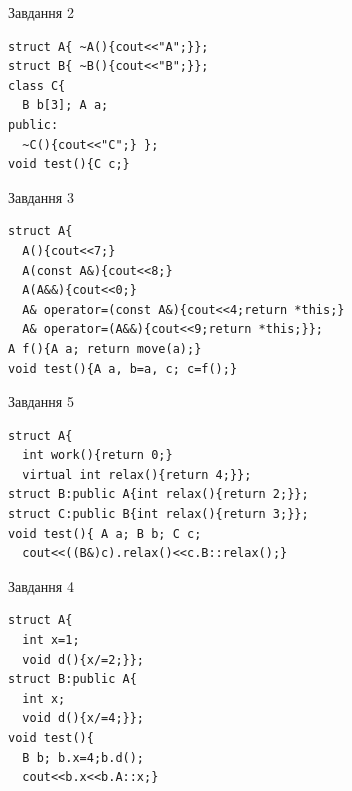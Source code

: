 \documentclass[12pt, ukrainian]{article}
\begin{document}
{{{{{{{\begin{minipage}[t]{11cm}
               
{\begin{center}Завдання {2}\end{center}}
\vspace{-6mm}

\begin{verbatim}
struct A{ ~A(){cout<<"A";}};
struct B{ ~B(){cout<<"B";}};
class C{
  B b[3]; A a;
public:
  ~C(){cout<<"C";} };
void test(){C c;}
\end{verbatim}            


               
{\begin{center}Завдання {3}\end{center}}
\vspace{-6mm}

\begin{verbatim}
struct A{
  A(){cout<<7;}
  A(const A&){cout<<8;}
  A(A&&){cout<<0;}
  A& operator=(const A&){cout<<4;return *this;}
  A& operator=(A&&){cout<<9;return *this;}};
A f(){A a; return move(a);}
void test(){A a, b=a, c; c=f();}
\end{verbatim}            


               
{\begin{center}Завдання {5}\end{center}}
\vspace{-6mm}

\begin{verbatim}
struct A{
  int work(){return 0;}
  virtual int relax(){return 4;}};
struct B:public A{int relax(){return 2;}};
struct C:public B{int relax(){return 3;}};
void test(){ A a; B b; C c;
  cout<<((B&)c).relax()<<c.B::relax();}
\end{verbatim}            


\end{minipage}
\vline \hspace{8mm}
\begin{minipage}[t]{7cm}
               
{\begin{center}Завдання {4}\end{center}}
\vspace{-6mm}

\begin{verbatim}
struct A{
  int x=1;
  void d(){x/=2;}};
struct B:public A{
  int x;
  void d(){x/=4;}};
void test(){
  B b; b.x=4;b.d();
  cout<<b.x<<b.A::x;}
\end{verbatim}            



\end{minipage}}}}}}}}
\end{document}
